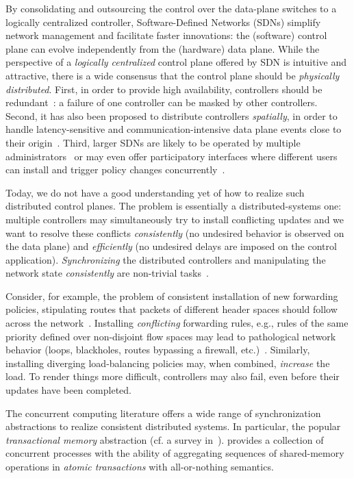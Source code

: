 \documentclass[conference]{sigcomm-alternate}
\begin{document}
By consolidating and outsourcing the control over the data-plane switches to a logically
centralized controller, Software-Defined Networks (SDNs)
simplify network management and facilitate faster innovations:
the (software) control plane can evolve independently from the
(hardware) data plane.
While the perspective of a \emph{logically centralized} control plane
offered by SDN is intuitive and attractive,
there is a wide consensus that
the control plane should be  \emph{physically distributed}.
First, in order to provide high availability,
controllers should be redundant~\cite{onix,onos,elasticon}: a failure
of one controller can be masked by other controllers.
Second, it has also been proposed to distribute controllers \emph{spatially}, in order to handle latency-sensitive and
communication-intensive
data plane
events close to their origin~\cite{devoflow,kandoo}.
Third, larger SDNs are likely to be operated by multiple administrators~\cite{stn} or may even offer
participatory interfaces where different users can install and trigger policy changes
concurrently~\cite{participatory}.

Today, we do not have a good understanding yet of how to realize
such distributed control planes. The problem is essentially a
distributed-systems
one: multiple controllers may simultaneously try to
install conflicting updates and we want to resolve these conflicts
\emph{consistently} (no undesired behavior is observed on the data
plane) and \emph{efficiently} (no undesired delays are imposed on the
control application).
\emph{Synchronizing}
the distributed controllers and manipulating the network state \emph{consistently}
are non-trivial tasks~\cite{sharon}.

Consider, for example, the problem of
consistent installation of new forwarding policies, stipulating routes
that packets of different header spaces should follow across the
network~\cite{network-update,roger-hotnets,podc15}.
Installing \emph{conflicting} forwarding rules, e.g., rules of the same priority defined over non-disjoint
flow spaces may lead to pathological network behavior (loops,
blackholes, routes bypassing a firewall, etc.)~\cite{hotnets14update,roger-hotnets}.
Similarly, installing diverging load-balancing policies may,
when combined, \emph{increase} the load.
To render things more difficult, controllers may also fail,
even before their updates have been completed.

The concurrent computing literature offers
a wide range of synchronization abstractions
to realize consistent distributed systems.
In particular, the popular 
\emph{transactional  memory} abstraction (cf. a survey in~\cite{tm-book}). 
provides a
collection of
concurrent processes with the ability of aggregating sequences of
shared-memory operations in \emph{atomic  transactions} with
all-or-nothing semantics.
\end{document}
